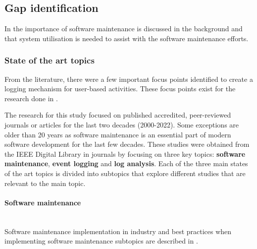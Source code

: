 \clearpage

\subsection{Gap identification}
In  the importance of software maintenance is discussed in the background and that system utilisation is needed to assist with the software maintenance efforts.

\subsubsection{State of the art topics}
From the literature, there were a few important focus points identified to create a logging mechanism for user-based activities. These focus points exist for the research done in .\par The research for this study focused on published accredited, peer-reviewed journals or articles for the last two decades (2000-2022). Some exceptions are older than 20 years as software maintenance is an essential part of modern software development for the last few decades. These studies were obtained from the IEEE Digital Library in journals by focusing on three key topics: \textbf{software maintenance}, \textbf{event logging} and \textbf{log analysis}. Each of the three main states of the art topics is divided into subtopics that explore different studies that are relevant to the main topic.

\paragraph{Software maintenance} \leavevmode\\
Software maintenance implementation in industry and best practices when implementing software maintenance subtopics are described in .

